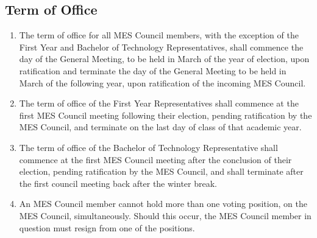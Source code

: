 \subsection{Term of Office}
\label{term-of-office}
\begin{enumerate}
 \item
  The term of office for all MES Council members, with the exception of the First Year and Bachelor of Technology Representatives, shall commence the day of the General Meeting, to be held in March of the year of election, upon ratification and terminate the day of the General Meeting to be held in March of the following year, upon ratification of the incoming MES Council.
 \item
  The term of office of the First Year Representatives shall commence at the first MES Council meeting following their election, pending ratification by the MES Council, and terminate on the last day of class of that academic year.
 \item
  The term of office of the Bachelor of Technology Representative shall commence at the first MES Council meeting after the conclusion of their election, pending ratification by the MES Council, and shall terminate after the first council meeting back after the winter break.
 \item
  An MES Council member cannot hold more than one voting position, on the MES Council, simultaneously. Should this occur, the MES Council member in question must resign from one of the positions.

\end{enumerate}

